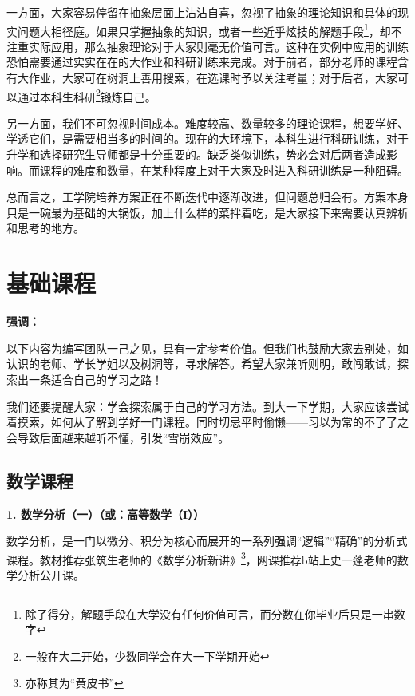 \vspace{10pt}

一方面，大家容易停留在抽象层面上沾沾自喜，忽视了抽象的理论知识和具体的现实问题大相径庭。如果只掌握抽象的知识，或者一些近乎炫技的解题手段\footnote{除了得分，解题手段在大学没有任何价值可言，而分数在你毕业后只是一串数字}，却不注重实际应用，那么抽象理论对于大家则毫无价值可言。这种在实例中应用的训练恐怕需要通过实实在在的大作业和科研训练来完成。对于前者，部分老师的课程含有大作业，大家可在树洞上善用搜索，在选课时予以关注考量；对于后者，大家可以通过本科生科研\footnote{一般在大二开始，少数同学会在大一下学期开始}锻炼自己。

\vspace{10pt}

另一方面，我们不可忽视时间成本。难度较高、数量较多的理论课程，想要学好、学透它们，是需要相当多的时间的。现在的大环境下，本科生进行科研训练，对于升学和选择研究生导师都是十分重要的。缺乏类似训练，势必会对后两者造成影响。而课程的难度和数量，在某种程度上对于大家及时进入科研训练是一种阻碍。

\vspace{10pt}

总而言之，工学院培养方案正在不断迭代中逐渐改进，但问题总归会有。方案本身只是一碗最为基础的大锅饭，加上什么样的菜拌着吃，是大家接下来需要认真辨析和思考的地方。

\section{基础课程}
\textbf{强调：}

以下内容为编写团队一己之见，具有一定参考价值。但我们也鼓励大家去别处，如认识的老师、学长学姐以及树洞等，寻求解答。希望大家兼听则明，敢闯敢试，探索出一条适合自己的学习之路！

\vspace{10pt}

我们还要提醒大家：学会探索属于自己的学习方法。到大一下学期，大家应该尝试着摸索，如何从了解到学好一门课程。同时切忌平时偷懒——习以为常的不了了之会导致后面越来越听不懂，引发“雪崩效应”。

\subsection{数学课程}
\textbf{1. 数学分析（一）（或：高等数学（I））}

数学分析，是一门以微分、积分为核心而展开的一系列强调“逻辑”“精确”的分析式课程。教材推荐张筑生老师的《数学分析新讲》\footnote{亦称其为“黄皮书”}，网课推荐b站上史一蓬老师的数学分析公开课。

